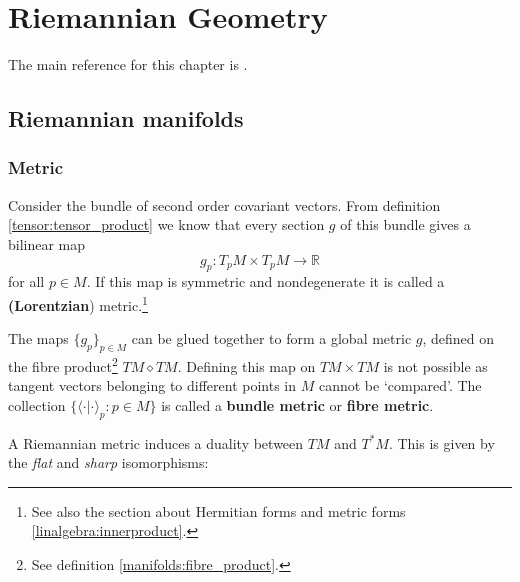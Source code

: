 \chapter{Riemannian Geometry}\label{chapter:riemann}

    The main reference for this chapter is \cite{petersen}.

\section{Riemannian manifolds}
\subsection{Metric}

    \begin{definition}
        Consider the bundle of second order covariant vectors. From definition \ref{tensor:tensor_product} we know that every section $g$ of this bundle gives a bilinear map \[g_p:T_pM\times T_pM\rightarrow\mathbb{R}\] for all $p\in M$. If this map is symmetric and nondegenerate it is called a \textbf{(Lorentzian}) metric.\footnote{See also the section about Hermitian forms and metric forms \ref{linalgebra:innerproduct}.}

        The maps $\{g_p\}_{p\in M}$ can be glued together to form a global metric $g$, defined on the fibre product\footnote{See definition \ref{manifolds:fibre_product}.} $TM\diamond TM$. Defining this map on $TM\times TM$ is not possible as tangent vectors belonging to different points in $M$ cannot be `compared'. The collection $\{\langle\cdot|\cdot\rangle_p:p\in M\}$ is called a \textbf{bundle metric} or \textbf{fibre metric}.
    \end{definition}

    A Riemannian metric induces a duality between $TM$ and $T^*M$. This is given by the \textit{flat} and \textit{sharp} isomorphisms:

